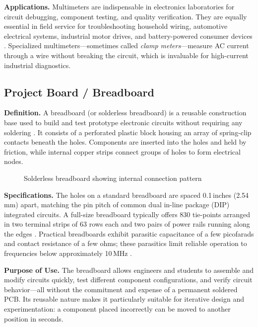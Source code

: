 \documentclass[12pt, a4paper, twoside]{report}
\newcommand{\imgplaceholder}[2]{%
  \begin{figure}[H]
    \centering
    \fcolorbox{gray!60}{gray!12}{%
      \parbox[c][5cm][c]{0.65\textwidth}{%
        \centering
        \textcolor{gray!80}{\Large [Image Placeholder]}\\[6pt]
        \textcolor{gray}{\small Insert figure here}
      }%
    }
    \caption{#1}
    \label{fig:#2}
  \end{figure}
}
\begin{document}
\textbf{Applications.}\quad
Multimeters are indispensable in electronics laboratories for circuit debugging,
component testing, and quality verification. They are equally essential in field service
for troubleshooting household wiring, automotive electrical systems, industrial motor
drives, and battery-powered consumer devices \cite{wiki:multimeter}. Specialized
multimeters---sometimes called \textit{clamp meters}---measure AC current through a wire
without breaking the circuit, which is invaluable for high-current industrial diagnostics.

\subsection{Project Board / Breadboard}

\textbf{Definition.}\quad
A breadboard (or solderless breadboard) is a reusable construction base used to build
and test prototype electronic circuits without requiring any soldering \cite{wiki:breadboard}.
It consists of a perforated plastic block housing an array of spring-clip contacts beneath
the holes. Components are inserted into the holes and held by friction, while internal
copper strips connect groups of holes to form electrical nodes.

\imgplaceholder{Solderless breadboard showing internal connection pattern}{breadboard}

\textbf{Specifications.}\quad
The holes on a standard breadboard are spaced 0.1\,inches (2.54\,mm) apart, matching the
pin pitch of common dual in-line package (DIP) integrated circuits. A full-size breadboard
typically offers 830 tie-points arranged in two terminal strips of 63 rows each and two
pairs of power rails running along the edges \cite{wiki:breadboard}. Practical breadboards
exhibit parasitic capacitance of a few picofarads and contact resistance of a few ohms;
these parasitics limit reliable operation to frequencies below approximately 10\,MHz
\cite{analog:breadboard}.

\textbf{Purpose of Use.}\quad
The breadboard allows engineers and students to assemble and modify circuits quickly,
test different component configurations, and verify circuit behavior---all without the
commitment and expense of a permanent soldered PCB. Its reusable nature makes it
particularly suitable for iterative design and experimentation: a component placed
incorrectly can be moved to another position in seconds.
\end{document}
